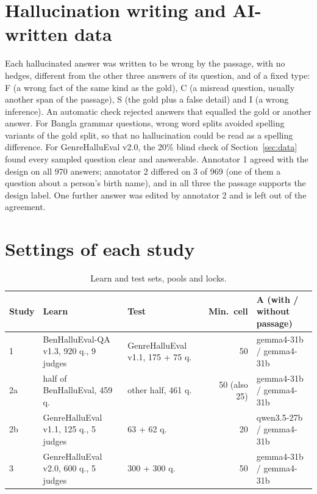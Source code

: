 \documentclass[pdflatex,sn-apa]{sn-jnl}
\begin{document}
\begin{appendices}

\section{Hallucination writing and AI-written data}\label{app:ai}

Each hallucinated answer was written to be wrong by the passage, with no hedges, different from the other three
answers of its question, and of a fixed type: F (a wrong fact of the same kind as the gold), C (a misread question,
usually another span of the passage), S (the gold plus a false detail) and I (a wrong inference). An automatic check
rejected answers that equalled the gold or another answer. For Bangla grammar questions, wrong word splits avoided
spelling variants of the gold split, so that no hallucination could be read as a spelling difference. For GenreHalluEval
v2.0, the 20\% blind check of Section~\ref{sec:data} found every sampled question clear and answerable. Annotator 1
agreed with the design on all 970 answers; annotator 2 differed on 3 of 969 (one of them a question about a person's
birth name), and in all three the passage supports the design label. One further answer was edited by annotator 2
and is left out of the agreement.

\section{Settings of each study}\label{app:settings}

\begin{table}[h]
\centering\small
\caption{Learn and test sets, pools and locks.}
\begin{tabularx}{\textwidth}{@{}l X X r X@{}}
\toprule
Study & Learn & Test & Min.\ cell & A (with / without passage) \\
\midrule
1 & BenHalluEval-QA v1.3, 920 q., 9 judges & GenreHalluEval v1.1, 175 + 75 q. & 50 & gemma4-31b / gemma4-31b \\
2a & half of BenHalluEval, 459 q. & other half, 461 q. & 50 (also 25) & gemma4-31b / gemma4-31b \\
2b & GenreHalluEval v1.1, 125 q., 5 judges & 63 + 62 q. & 20 & qwen3.5-27b / gemma4-31b \\
3 & GenreHalluEval v2.0, 600 q., 5 judges & 300 + 300 q. & 50 & gemma4-31b / gemma4-31b \\
\bottomrule
\end{tabularx}
\end{table}

\end{appendices}


\end{document}
